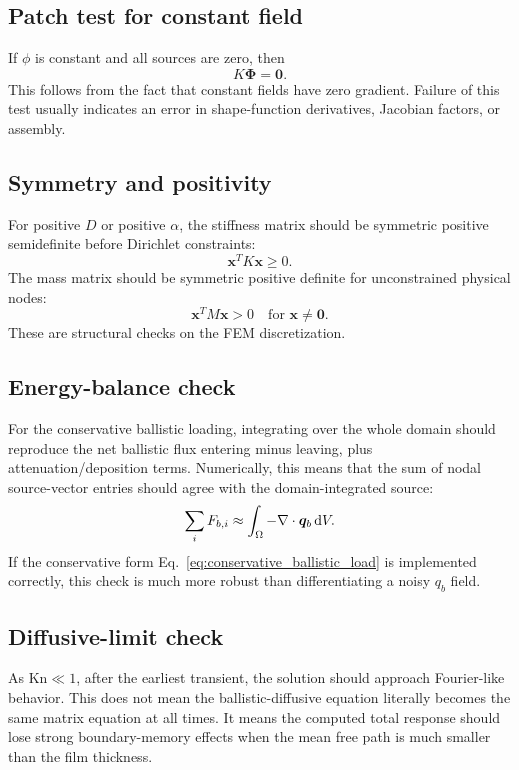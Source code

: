 \documentclass[11pt]{article}
\begin{document}
\subsection{Patch test for constant field}
If \(\phi\) is constant and all sources are zero, then
\begin{equation}
    K\bm{\Phi}=\bm{0}.
\end{equation}
This follows from the fact that constant fields have zero gradient. Failure of this test usually indicates an error in shape-function derivatives, Jacobian factors, or assembly.

\subsection{Symmetry and positivity}
For positive \(D\) or positive \(\alpha\), the stiffness matrix should be symmetric positive semidefinite before Dirichlet constraints:
\begin{equation}
    \bm{x}^TK\bm{x}\ge 0.
\end{equation}
The mass matrix should be symmetric positive definite for unconstrained physical nodes:
\begin{equation}
    \bm{x}^TM\bm{x}>0
    \quad \text{for }\bm{x}\ne\bm{0}.
\end{equation}
These are structural checks on the FEM discretization.

\subsection{Energy-balance check}
For the conservative ballistic loading, integrating over the whole domain should reproduce the net ballistic flux entering minus leaving, plus attenuation/deposition terms. Numerically, this means that the sum of nodal source-vector entries should agree with the domain-integrated source:
\begin{equation}
    \sum_i F_{b,i}\approx\int_\Omega -\nabla\cdot\bm{q}_b\,\dd V.
\end{equation}
If the conservative form Eq.~\eqref{eq:conservative_ballistic_load} is implemented correctly, this check is much more robust than differentiating a noisy \(q_b\) field.

\subsection{Diffusive-limit check}
As \(\mathrm{Kn}\ll1\), after the earliest transient, the solution should approach Fourier-like behavior. This does not mean the ballistic-diffusive equation literally becomes the same matrix equation at all times. It means the computed total response should lose strong boundary-memory effects when the mean free path is much smaller than the film thickness.
\end{document}
